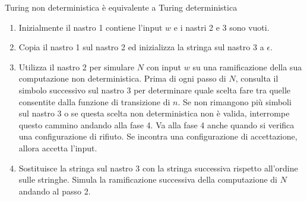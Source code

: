 \begin{Thm}{Turing non deterministica è equivalente a Turing deterministica}{}
\begin{demonstration}

\begin{enumerate}
    \item Inizialmente il nastro 1 contiene l'input $w$ e i nastri 2 e 3 sono vuoti.
    \item Copia il nastro 1 sul nastro 2 ed inizializza la stringa sul nastro 3 a $\epsilon$.
    \item Utilizza il nastro 2 per simulare $N$ con input $w$ su una ramificazione della sua computazione non deterministica. Prima di ogni passo di $N$, consulta il simbolo successivo sul nastro 3 per determinare quale scelta fare tra quelle consentite dalla funzione di transizione di $n$. Se non rimangono più simboli sul nastro 3 o se questa scelta non deterministica non è valida, interrompe questo cammino andando alla fase 4. Va alla fase 4 anche quando si verifica una configurazione di rifiuto. Se incontra una configurazione di accettazione, allora accetta l'input.
    \item Sostituisce la stringa sul nastro 3 con la stringa successiva rispetto all'ordine sulle stringhe. Simula la ramificazione successiva della computazione di $N$ andando al passo 2.
\end{enumerate}
\end{demonstration}
\end{Thm}

